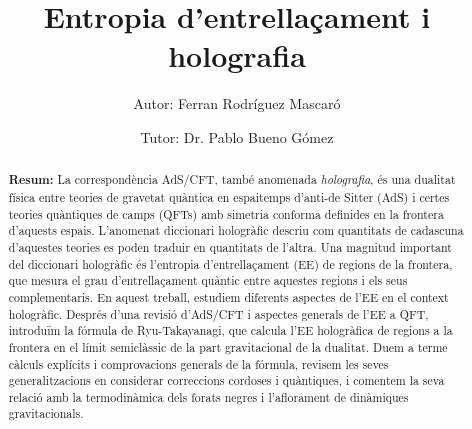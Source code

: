 \documentclass[twocolumn]{revtex4}
\begin{document}
\pagestyle{fancy}


\title{Entropia d'entrellaçament i holografia}
\author{Autor: Ferran Rodríguez Mascaró}
\author{Tutor: Dr. Pablo Bueno Gómez}


\begin{abstract}
    {\bf Resum:} La correspondència AdS/CFT, també anomenada \emph{holografia}, és una dualitat física entre teories de gravetat quàntica en espaitemps d'anti-de Sitter (AdS) i certes teories quàntiques de camps (QFTs) amb simetria conforma definides en la frontera d'aquests espais. L'anomenat diccionari hologràfic descriu com quantitats de cadascuna d'aquestes teories es poden traduir en quantitats de l'altra. Una magnitud important del diccionari hologràfic és l'entropia d'entrellaçament (EE) de regions de la frontera, que mesura el grau d'entrellaçament quàntic entre aquestes regions i els seus complementaris. En aquest treball, estudiem diferents aspectes de l'EE en el context hologràfic. Després d'una revisió d'AdS/CFT i aspectes generals de l'EE a QFT, introduïm la fórmula de Ryu-Takayanagi, que calcula l'EE hologràfica de regions a la frontera en el límit semiclàssic de la part gravitacional de la dualitat. Duem a terme càlculs explícits i comprovacions generals de la fórmula, revisem les seves generalitzacions en considerar correccions cordoses i quàntiques, i comentem la seva relació amb la termodinàmica dels forats negres i l'aflorament de dinàmiques gravitacionals.
\end{abstract}


\maketitle
\end{document}
